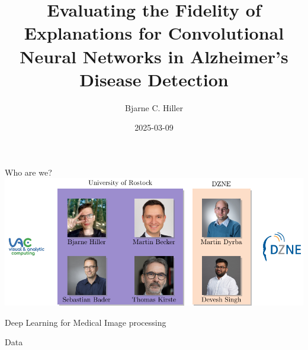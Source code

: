 \documentclass[aspectratio=169]{beamer}
\title[Fidelity of Explanations for AD Classification from MRI]{Evaluating the Fidelity of Explanations for Convolutional Neural Networks in Alzheimer’s Disease Detection}
\author[Hiller]{Bjarne C. Hiller}
\date{2025-03-09}
\institute[Uni Rostock]{University of Rostock}
\begin{document}
\maketitle


%
\begin{frame}{Who are we?}
	\centering
	\includegraphics[width=\textwidth]{tikz/team.tikz/team.pdf}
\end{frame}

\begin{frame}{Deep Learning for Medical Image processing}
\end{frame}

\begin{frame}{Data}
\end{frame}
\end{document}
